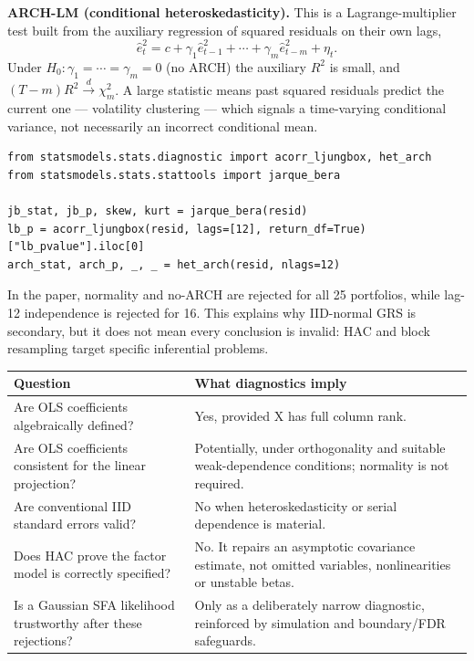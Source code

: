 \textbf{ARCH-LM (conditional heteroskedasticity).} This is a
Lagrange-multiplier test built from the auxiliary regression of squared
residuals on their own lags,
\begin{equation}\label{eq:ch13-arch}
\hat e_t^{2} = c + \gamma_1\hat e_{t-1}^{2} + \cdots + \gamma_m\hat e_{t-m}^{2} + \eta_t .
\end{equation}
Under $H_0:\gamma_1=\cdots=\gamma_m=0$ (no ARCH) the auxiliary $R^2$ is
small, and $(T-m)R^2\xrightarrow{d}\chi^2_m$. A large statistic means past
squared residuals predict the current one --- volatility clustering ---
which signals a time-varying conditional variance, not necessarily an
incorrect conditional mean.

\begin{verbatim}
from statsmodels.stats.diagnostic import acorr_ljungbox, het_arch
from statsmodels.stats.stattools import jarque_bera

jb_stat, jb_p, skew, kurt = jarque_bera(resid)
lb_p = acorr_ljungbox(resid, lags=[12], return_df=True)["lb_pvalue"].iloc[0]
arch_stat, arch_p, _, _ = het_arch(resid, nlags=12)
\end{verbatim}

In the paper, normality and no-ARCH are rejected for all 25 portfolios,
while lag-12 independence is rejected for 16. This explains why
IID-normal GRS is secondary, but it does not mean every conclusion is
invalid: HAC and block resampling target specific inferential problems.

\begin{longtable}[]{@{}p{}p{}@{}}
\toprule\noalign{}
Question & What diagnostics imply \\
\midrule\noalign{}
\endhead
\bottomrule\noalign{}
\endlastfoot
Are OLS coefficients algebraically defined? & Yes, provided X has full
column rank. \\
Are OLS coefficients consistent for the linear projection? &
Potentially, under orthogonality and suitable weak-dependence
conditions; normality is not required. \\
Are conventional IID standard errors valid? & No when heteroskedasticity
or serial dependence is material. \\
Does HAC prove the factor model is correctly specified? & No. It repairs
an asymptotic covariance estimate, not omitted variables, nonlinearities
or unstable betas. \\
Is a Gaussian SFA likelihood trustworthy after these rejections? & Only
as a deliberately narrow diagnostic, reinforced by simulation and
boundary/FDR safeguards. \\
\end{longtable}

